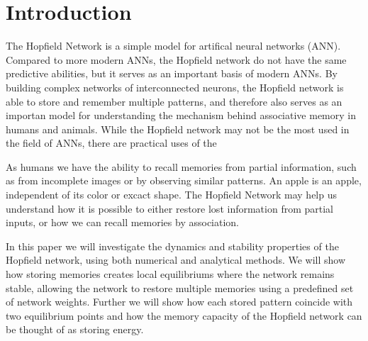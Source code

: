 \section{Introduction}
The Hopfield Network is a simple model for artifical neural networks (ANN). Compared to more modern ANNs, the Hopfield network do not have the same predictive abilities, but it serves as an important basis of modern ANNs. By building complex networks of interconnected neurons, the Hopfield network is able to store and remember multiple patterns, and therefore also serves as an importan model for understanding the mechanism behind associative memory in humans and animals. While the Hopfield network may not be the most used in the field of ANNs, there are practical uses of the 

As humans we have the ability to recall memories from partial information, such as from incomplete images or by observing similar patterns. An apple is an apple, independent of its color or excact shape. The Hopfield Network may help us understand how it is possible to either restore lost information from partial inputs, or how we can recall memories by association.

In this paper we will investigate the dynamics and stability properties of the Hopfield network, using both numerical and analytical methods. We will show how storing memories creates local equilibriums where the network remains stable, allowing the network to restore multiple memories using a predefined set of network weights. Further we will show how each stored pattern coincide with two equilibrium points and how the memory capacity of the Hopfield network can be thought of as storing energy.